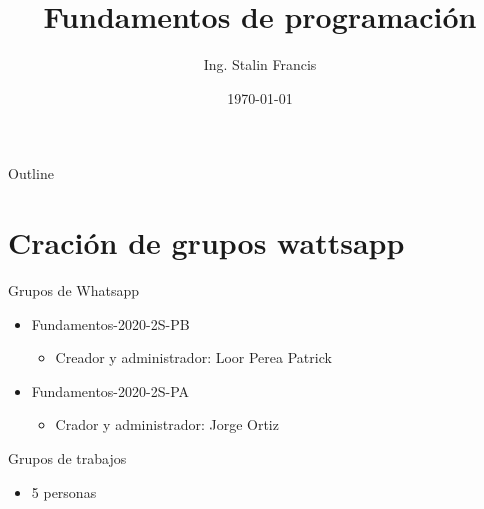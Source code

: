 \documentclass[presentation, aspectratio=54]{beamer}
\author{Ing. Stalin Francis}
\date{\today}
\title{Fundamentos de programación}
\begin{document}
\maketitle
\begin{frame}{Outline}
\tableofcontents
\end{frame}




\section{Cración de grupos wattsapp}
\label{sec:org7a8fdb2}
\begin{frame}[label={sec:org3352864}]{Grupos de Whatsapp}
\begin{itemize}
\item Fundamentos-2020-2S-PB
\begin{itemize}
\item Creador y administrador: Loor Perea Patrick
\end{itemize}
\item Fundamentos-2020-2S-PA
\begin{itemize}
\item Crador y administrador: Jorge Ortiz
\end{itemize}
\end{itemize}
\end{frame}
\begin{frame}[label={sec:org31d6079}]{Grupos de trabajos}
\begin{itemize}
\item 5 personas
\end{itemize}
\end{frame}
\end{document}
